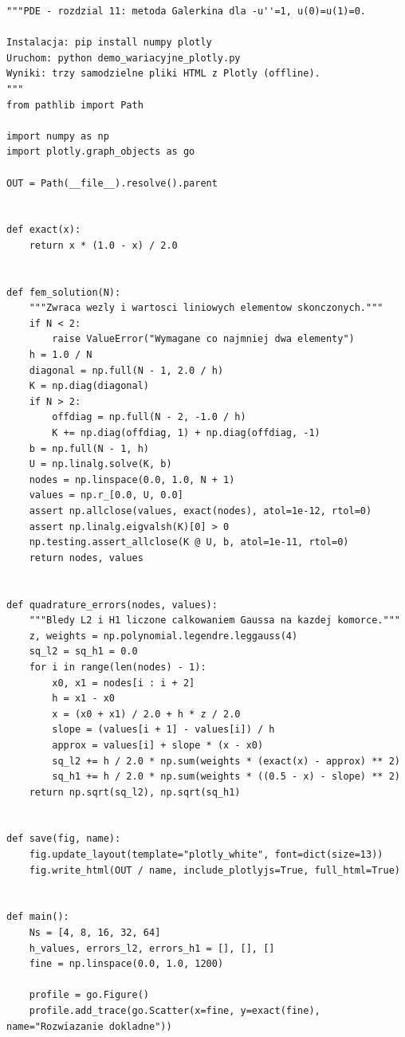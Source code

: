 \begin{lstlisting}[style=pythonpde,caption={Galerkin, błędy i funkcjonał energii (Plotly)},label={code:pde11-galerkin}]
"""PDE - rozdzial 11: metoda Galerkina dla -u''=1, u(0)=u(1)=0.

Instalacja: pip install numpy plotly
Uruchom: python demo_wariacyjne_plotly.py
Wyniki: trzy samodzielne pliki HTML z Plotly (offline).
"""
from pathlib import Path

import numpy as np
import plotly.graph_objects as go

OUT = Path(__file__).resolve().parent


def exact(x):
    return x * (1.0 - x) / 2.0


def fem_solution(N):
    """Zwraca wezly i wartosci liniowych elementow skonczonych."""
    if N < 2:
        raise ValueError("Wymagane co najmniej dwa elementy")
    h = 1.0 / N
    diagonal = np.full(N - 1, 2.0 / h)
    K = np.diag(diagonal)
    if N > 2:
        offdiag = np.full(N - 2, -1.0 / h)
        K += np.diag(offdiag, 1) + np.diag(offdiag, -1)
    b = np.full(N - 1, h)
    U = np.linalg.solve(K, b)
    nodes = np.linspace(0.0, 1.0, N + 1)
    values = np.r_[0.0, U, 0.0]
    assert np.allclose(values, exact(nodes), atol=1e-12, rtol=0)
    assert np.linalg.eigvalsh(K)[0] > 0
    np.testing.assert_allclose(K @ U, b, atol=1e-11, rtol=0)
    return nodes, values


def quadrature_errors(nodes, values):
    """Bledy L2 i H1 liczone calkowaniem Gaussa na kazdej komorce."""
    z, weights = np.polynomial.legendre.leggauss(4)
    sq_l2 = sq_h1 = 0.0
    for i in range(len(nodes) - 1):
        x0, x1 = nodes[i : i + 2]
        h = x1 - x0
        x = (x0 + x1) / 2.0 + h * z / 2.0
        slope = (values[i + 1] - values[i]) / h
        approx = values[i] + slope * (x - x0)
        sq_l2 += h / 2.0 * np.sum(weights * (exact(x) - approx) ** 2)
        sq_h1 += h / 2.0 * np.sum(weights * ((0.5 - x) - slope) ** 2)
    return np.sqrt(sq_l2), np.sqrt(sq_h1)


def save(fig, name):
    fig.update_layout(template="plotly_white", font=dict(size=13))
    fig.write_html(OUT / name, include_plotlyjs=True, full_html=True)


def main():
    Ns = [4, 8, 16, 32, 64]
    h_values, errors_l2, errors_h1 = [], [], []
    fine = np.linspace(0.0, 1.0, 1200)

    profile = go.Figure()
    profile.add_trace(go.Scatter(x=fine, y=exact(fine), name="Rozwiazanie dokladne"))


\end{lstlisting}
